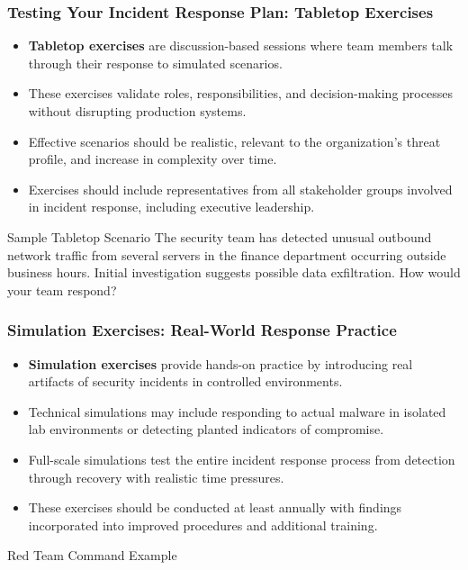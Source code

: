 \documentclass{beamer}
\begin{document}
\begin{frame}
\frametitle{Testing Your Incident Response Plan: Tabletop Exercises}
\begin{itemize}
\item \textbf{Tabletop exercises} are discussion-based sessions where team members talk through their response to simulated scenarios.
\item These exercises validate roles, responsibilities, and decision-making processes without disrupting production systems.
\item Effective scenarios should be realistic, relevant to the organization's threat profile, and increase in complexity over time.
\item Exercises should include representatives from all stakeholder groups involved in incident response, including executive leadership.
\end{itemize}

\begin{exampleblock}{Sample Tabletop Scenario}
The security team has detected unusual outbound network traffic from several servers in the finance department occurring outside business hours. Initial investigation suggests possible data exfiltration. How would your team respond?
\end{exampleblock}
\end{frame}

\begin{frame}[fragile]
\frametitle{Simulation Exercises: Real-World Response Practice}
\begin{itemize}
\item \textbf{Simulation exercises} provide hands-on practice by introducing real artifacts of security incidents in controlled environments.
\item Technical simulations may include responding to actual malware in isolated lab environments or detecting planted indicators of compromise.
\item Full-scale simulations test the entire incident response process from detection through recovery with realistic time pressures.
\item These exercises should be conducted at least annually with findings incorporated into improved procedures and additional training.
\end{itemize}

\begin{exampleblock}{Red Team Command Example}
\scriptsize
{}
\end{exampleblock}
\end{frame}
\end{document}
